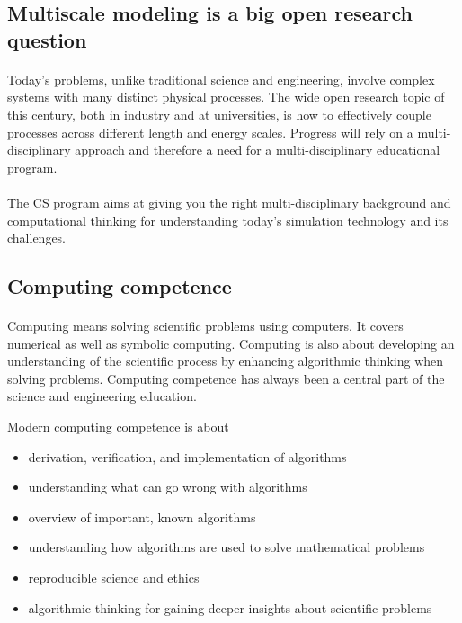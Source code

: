 \documentclass[%
oneside,                 %
final,                   %
10pt]{article}
\begin{document}
\subsection*{Multiscale modeling is a big open research question}


\paragraph{}
Today's problems, unlike traditional
science and engineering, involve complex systems with many distinct
physical processes. The wide open research topic of this century, both
in industry and at universities, is how to effectively couple
processes across different length and energy scales. Progress will
rely on a multi-disciplinary approach and therefore a need for
a multi-disciplinary educational program.




\paragraph{}
The CS program aims at giving you  the right
multi-disciplinary background and computational thinking for
understanding today's simulation technology and its challenges.



\subsection*{Computing competence}

\paragraph{}
Computing means solving scientific problems using computers. It covers
numerical as well as symbolic computing. Computing is also about
developing an understanding of the scientific process by enhancing
algorithmic thinking when solving problems.  Computing competence has
always been a central part of the science and engineering
education.

Modern computing competence is about

\begin{itemize}
\item derivation, verification, and implementation of algorithms

\item understanding what can go wrong with algorithms

\item overview of important, known algorithms

\item understanding how algorithms are used to solve mathematical problems

\item reproducible science and ethics

\item algorithmic thinking for gaining deeper insights about scientific problems
\end{itemize}
\end{document}
